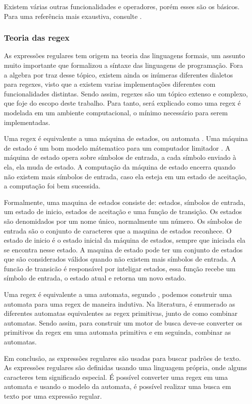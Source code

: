 Existem várias outras funcionalidades e operadores, porém esses são os básicos.
Para uma referência mais exaustiva, consulte \cite{mastering}.

\subsubsection{Teoria das regex}
As expressões regulares tem origem na teoria das linguagens formais, um assunto muito importante que formalizou a síntaxe das linguagens de programação.
Fora a algebra por traz desse tópico, existem ainda os inúmeras diferentes dialetos para regexes, visto que a existem varias implementações diferentes com funcionalidades distintas.
Sendo assim, regexes são um tópico extenso e complexo, que foje do escopo deste trabalho.
Para tanto, será explicado como uma regex é modelada em um ambiente computacional, o mínimo necessário para serem implementadas.

Uma regex é equivalente a uma máquina de estados, ou automata \cite{theory-computation}.
Uma máquina de estado é um bom modelo mátematico para um computador limitador \cite{theory-computation}.
A máquina de estado opera sobre símbolos de entrada, a cada símbolo enviado à ela, ela muda de estado.
A computação da máquina de estado encerra quando não existem mais símbolos de entrada, caso ela esteja em um estado de aceitação, a computação foi bem sucessida.

Formalmente, uma maquina de estados consiste de: estados, símbolos de entrada, um estado de inicio, estados de aceitação e uma função de transição.
Os estados são denomidados por um nome único, normalmente um número.
Os símbolos de entrada são o conjunto de caracteres que a maquina de estados reconhece.
O estado de inicio é o estado inicial da máquina de estados, sempre que iniciada ela se encontra nesse estado.
A maquina de estado pode ter um conjunto de estados que são considerados válidos quando não existem mais símbolos de entrada.
A funcão de transicão é responsável por inteligar estados, essa função recebe um símbolo de entrada, o estado atual e retorna um novo estado. \cite{theory}

Uma regex é equivalente a uma automata, segundo \cite{dragon-book}, podemos construir uma automata para uma regex de maneira indutiva.
Na literatura, é enumerado as diferentes automatas equivalentes as regex primitivas, junto de como combinar automatas.
Sendo assim, para  construir um motor de busca deve-se converter os primitivos da regex em uma automata primitiva e em seguinda, combinar as automatas.

Em conclusão, as expressões regulares são usadas para buscar padrões de texto.
As expressões regulares são definidas usando uma linguagem própria, onde alguns caracteres tem significado especial.
É possível converter uma regex em uma automata e usando o modelo da automata, é possível realizar uma busca em texto por uma expressão regular.

